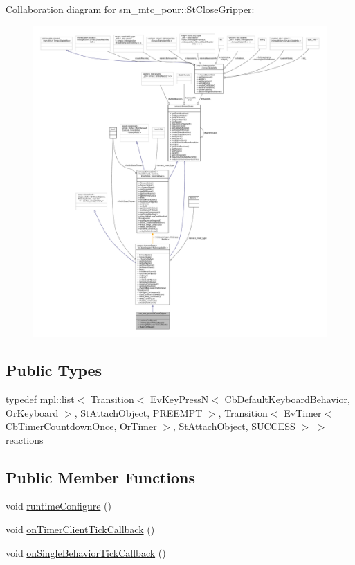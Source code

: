 Collaboration diagram for sm\+\_\+mtc\+\_\+pour\+:\+:St\+Close\+Gripper\+:
\nopagebreak
\begin{figure}[H]
\begin{center}
\leavevmode
\includegraphics[width=350pt]{structsm__mtc__pour_1_1StCloseGripper__coll__graph}
\end{center}
\end{figure}
\subsection*{Public Types}
\begin{DoxyCompactItemize}
\item 
typedef mpl\+::list$<$ Transition$<$ Ev\+Key\+PressN$<$ Cb\+Default\+Keyboard\+Behavior, \hyperlink{classsm__mtc__pour_1_1OrKeyboard}{Or\+Keyboard} $>$, \hyperlink{structsm__mtc__pour_1_1StAttachObject}{St\+Attach\+Object}, \hyperlink{classPREEMPT}{P\+R\+E\+E\+M\+PT} $>$, Transition$<$ Ev\+Timer$<$ Cb\+Timer\+Countdown\+Once, \hyperlink{classsm__mtc__pour_1_1OrTimer}{Or\+Timer} $>$, \hyperlink{structsm__mtc__pour_1_1StAttachObject}{St\+Attach\+Object}, \hyperlink{classSUCCESS}{S\+U\+C\+C\+E\+SS} $>$ $>$ \hyperlink{structsm__mtc__pour_1_1StCloseGripper_a4e8a2396e13faa3e84127f21b6d04a83}{reactions}
\end{DoxyCompactItemize}
\subsection*{Public Member Functions}
\begin{DoxyCompactItemize}
\item 
void \hyperlink{structsm__mtc__pour_1_1StCloseGripper_ab9d0ee48606986c19bc6a5f151e6a4df}{runtime\+Configure} ()
\item 
void \hyperlink{structsm__mtc__pour_1_1StCloseGripper_a50820ae6e9d6c9210b8607de009edc12}{on\+Timer\+Client\+Tick\+Callback} ()
\item 
void \hyperlink{structsm__mtc__pour_1_1StCloseGripper_a213c2b27d6b8b82613c66969685ba78e}{on\+Single\+Behavior\+Tick\+Callback} ()
\end{DoxyCompactItemize}
